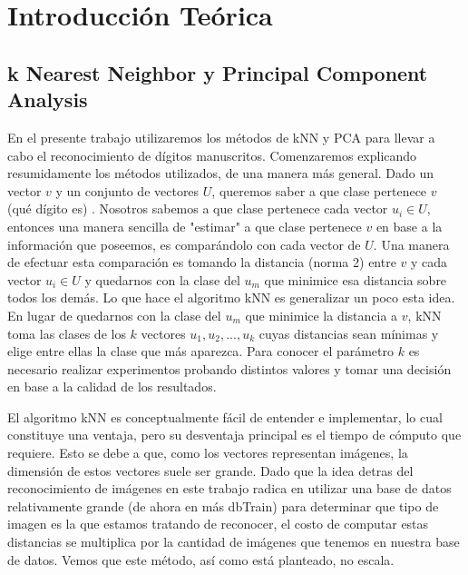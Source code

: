 \section{Introducción Teórica}
%
\subsection{k Nearest Neighbor y Principal Component Analysis}
En el presente trabajo utilizaremos los métodos de kNN y PCA para llevar a cabo el reconocimiento de dígitos manuscritos. Comenzaremos explicando resumidamente los métodos utilizados, de una manera más general. Dado un vector $v$ y un conjunto de vectores $U$, queremos saber a que clase pertenece $v$ (qué dígito es) . Nosotros sabemos a que clase pertenece cada vector $u_i \in U$, entonces una manera sencilla de "estimar" a que clase pertenece $v$ en base a la información que poseemos, es comparándolo con cada vector de $U$. Una manera de efectuar esta comparación es tomando la distancia (norma 2) entre $v$ y cada vector $u_i \in U$ y quedarnos con la clase del $u_m$ que minimice esa distancia sobre todos los demás. Lo que hace el algoritmo kNN es generalizar un poco esta idea. En lugar de quedarnos con la clase del $u_m$ que minimice la distancia a $v$, kNN toma las clases de los $k$ vectores $u_1, u_2, ..., u_k$ cuyas distancias sean mínimas y elige entre ellas la clase que más aparezca. Para conocer el parámetro $k$ es necesario realizar experimentos probando distintos valores y tomar una decisión en base a la calidad de los resultados.
\par El algoritmo kNN es conceptualmente fácil de entender e implementar, lo cual constituye una ventaja, pero su desventaja principal es el tiempo de cómputo que requiere. Esto se debe a que, como los vectores representan imágenes, la dimensión de estos vectores suele ser grande. Dado que la idea detras del reconocimiento de imágenes en este trabajo radica en utilizar una base de datos relativamente grande (de ahora en más dbTrain) para determinar que tipo de imagen es la que estamos tratando de reconocer, el costo de computar estas distancias se multiplica por la cantidad de imágenes que tenemos en nuestra base de datos. Vemos que este método, así como está planteado, no escala.
